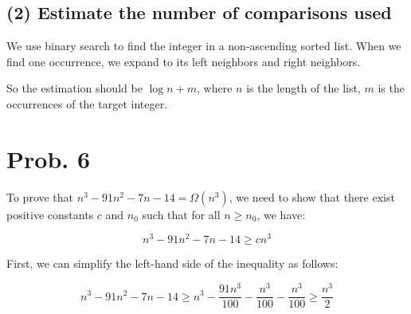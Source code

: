 \documentclass[12pt]{article}
\begin{document}
\begin{center}
\begin{algorithmic}[1]
                \State {}
                \State {}
            \Else
                \EndFor
                \EndFor
            \EndIf
        \EndProcedure
        \State {}
    \EndProcedure
\end{algorithmic}
\end{center}

\subsection{(2) Estimate the number of comparisons used}

We use binary search to find the integer in a non-ascending sorted list. When we find one occurrence, we expand to its left neighbors and right neighbors.

So the estimation should be $\log n + m$, where $n$ is the length of the list, $m$ is the occurrences of the target integer. 

\section{Prob. 6}

To prove that $n^3 - 91n^2 - 7n - 14 = \Omega(n^3)$, we need to show that there exist positive constants $c$ and $n_0$ such that for all $n \geq n_0$, we have:

$$n^3 - 91n^2 - 7n - 14 \geq cn^3$$

First, we can simplify the left-hand side of the inequality as follows:

$$n^3 - 91n^2 - 7n - 14 \geq n^3 - \frac{91n^3}{100} - \frac{n^3}{100} - \frac{n^3}{100} \geq \frac{n^3}{2}$$
\end{document}

